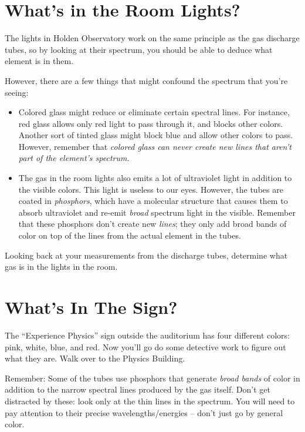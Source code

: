 \documentclass[11pt]{article}
\begin{document}
\section{ What's in the Room Lights?}

The lights in Holden Observatory work on the same principle as the gas discharge tubes, so by looking at their
spectrum, you should be able to deduce what element is in them.

However, there are a few things that might confound the spectrum that you're seeing:

\begin{itemize}


\item Colored glass might reduce or eliminate certain spectral lines. For instance, red glass allows only red light to pass through it, and blocks other colors. Another sort of tinted glass might block blue and allow other colors to pass. However, remember that {\it colored glass can never create new lines that aren't part of the element's spectrum}.

\item The gas in the room lights also emits a lot of ultraviolet light in addition to the visible colors. This light is useless to our eyes. However, the tubes are coated in {\it phosphors}, which have a molecular structure that causes them to absorb ultraviolet and re-emit {\it broad} spectrum light in the visible. Remember that these phosphors don't create new {\it lines}; they only add broad bands of color on top of the lines from the actual element in the tubes.

\end{itemize}

Looking back at your measurements from the discharge tubes, determine what gas is in the lights in the room. 
\bigskip

\section{ What's In The Sign?}

The ``Experience Physics'' sign outside the auditorium has four different colors: pink, white, blue, and red. Now you'll go do some detective work to figure out what they are. Walk over to the Physics Building.

Remember: Some of the tubes use phosphors that generate {\it broad bands} of color in addition to the narrow spectral
lines produced by the gas itself. Don't get distracted by these: look only at the thin lines in the spectrum. You will need to pay attention to their precise wavelengths/energies -- don't just go by general color.
\end{document}
